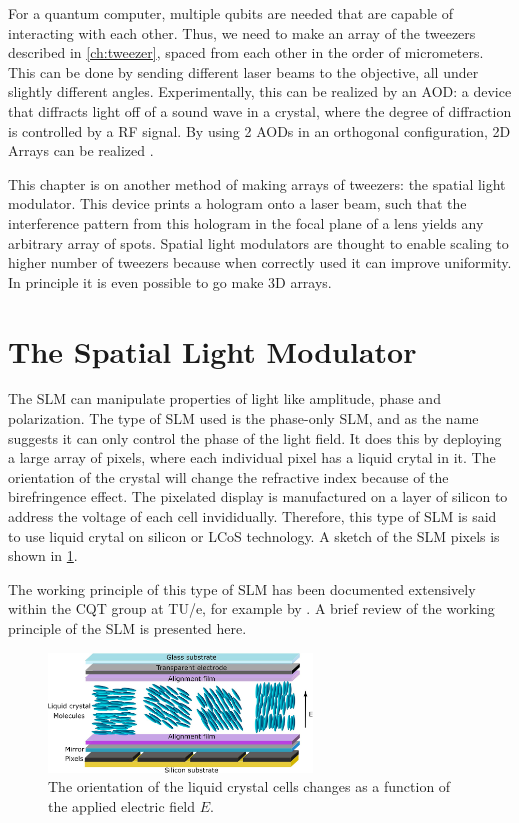 For a quantum computer, multiple qubits are needed that are capable of interacting with each other. Thus, we need to make an array of the tweezers described in \cref{ch:tweezer}, spaced from each other in the order of micrometers. This can be done by sending different laser beams to the objective, all under slightly different angles. Experimentally, this can be realized by an \ac{AOD}: a device that diffracts light off of a sound wave in a crystal, where the degree of diffraction is controlled by a RF signal. By using 2 AODs in an orthogonal configuration, 2D Arrays can be realized \cite{Manuel2016}.

This chapter is on another method of making arrays of tweezers: the spatial light modulator. This device prints a hologram onto a laser beam, such that the interference pattern from this hologram in the focal plane of a lens yields any arbitrary array of spots. Spatial light modulators are thought to enable scaling to higher number of tweezers because when correctly used it can improve uniformity. In principle it is even possible to go make 3D arrays. 

\section{The Spatial Light Modulator}

The \ac{SLM} can manipulate properties of light like amplitude, phase and polarization. The type of SLM used is the phase-only SLM, and as the name suggests it can only control the phase of the light field. 
It does this by deploying a large array of pixels, where each individual pixel has a liquid crytal in it. The orientation of the crystal will change the refractive index because of the birefringence effect. The pixelated display is manufactured on a layer of silicon to address the voltage of each cell invididually. Therefore, this type of SLM is said to use liquid crytal on silicon or LCoS technology. A sketch of the SLM pixels is shown in \cref{fig:LCoS}.

The working principle of this type of SLM has been documented extensively within the CQT group at TU/e, for example by \cite{Dijk2012,Bijnen2013}. A brief review of the working principle of the SLM is presented here.

\begin{figure}
    \centering
    \includegraphics[width=7cm]{figures/LCoS.png}
    \caption{The orientation of the liquid crystal cells changes as a function of the applied electric field $E$.}
    \label{fig:LCoS}
\end{figure}

